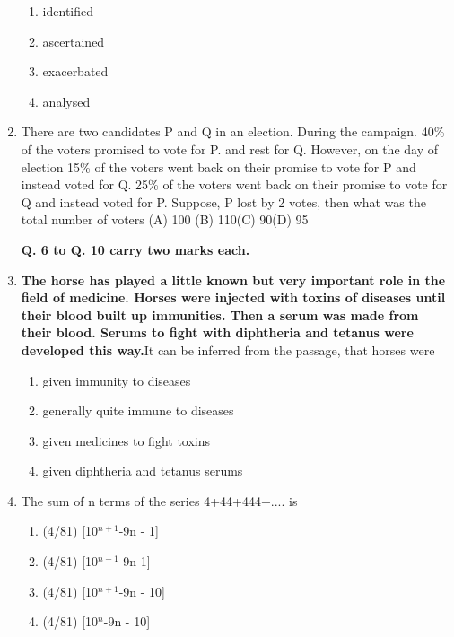 \documentclass[journal]{IEEEtran}
\begin{document}
\begin{enumerate}
\begin{enumerate}
			\item {identified}
			\item {ascertained}
			\item {exacerbated}
			\item {analysed}
		\end{enumerate}
	\item {There are two candidates P and Q in an election. During the campaign. 40\% of the voters promised to vote for P. and rest for Q. However, on the day of election 15\% of the voters went back on their promise to vote for P and instead voted for Q. 25\% of the voters went back on their promise to vote for Q and instead voted for P. Suppose, P lost by 2 votes, then what was the total number of voters
		\newline(A) 100 \hspace{10mm} (B) 110\hspace{10mm}(C) 90\hspace{10mm}(D) 95}

	\textbf{Q. 6 to Q. 10 carry two marks each.}
\item{ \textbf{The horse has played a little known but very important role in the field of medicine. Horses were injected with toxins of diseases until their blood built up immunities. Then a serum was made from their blood. Serums to fight with diphtheria and tetanus were developed this way.}\newline It can be inferred from the passage, that horses were}

		\begin{enumerate}
			\item{ given immunity to diseases}
			\item{generally quite immune to diseases}
			\item{given medicines to fight toxins}
			\item{given diphtheria and tetanus serums}

		\end{enumerate}

	\item {The sum of n terms of the series 4+44+444+.... is}
		\begin{enumerate}
			\item{(4/81) [10$^{n+1}$-9n - 1]}
			\item{(4/81) [10$^{n-1}$-9n-1]}
			\item{(4/81) [10$^{n+1}$-9n - 10]}
			\item{(4/81) [10$^n$-9n - 10]}

		\end{enumerate}


\end{enumerate}
\end{document}
